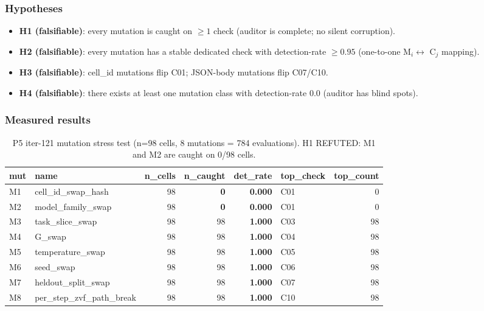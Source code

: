 \documentclass{article}  \usepackage[preprint,nonatbib]{neurips_2026} \usepackage[numbers]{natbib}
\begin{document}
\subsubsection{Hypotheses}
\begin{itemize}
  \item \textbf{H1 (falsifiable)}: every mutation is caught on $\geq 1$
        check (auditor is complete; no silent corruption).
  \item \textbf{H2 (falsifiable)}: every mutation has a stable dedicated
        check with detection-rate $\geq 0.95$ (one-to-one
        M$_i \leftrightarrow$ C$_j$ mapping).
  \item \textbf{H3 (falsifiable)}: cell\_id mutations flip C01; JSON-body
        mutations flip C07/C10.
  \item \textbf{H4 (falsifiable)}: there exists at least one mutation
        class with detection-rate $0.0$ (auditor has blind spots).
\end{itemize}

\subsubsection{Measured results}

\begin{table}[ht]
\centering
\small
\begin{tabular}{l l r r r l r}
\toprule
mut & name & n\_cells & n\_caught & det\_rate & top\_check & top\_count \\
\midrule
M1 & cell\_id\_swap\_hash        & 98 &  \textbf{0} & \textbf{0.000} & C01 & 0  \\
M2 & model\_family\_swap         & 98 &  \textbf{0} & \textbf{0.000} & C01 & 0  \\
M3 & task\_slice\_swap           & 98 & 98 & \textbf{1.000} & C03 & 98 \\
M4 & G\_swap                     & 98 & 98 & \textbf{1.000} & C04 & 98 \\
M5 & temperature\_swap           & 98 & 98 & \textbf{1.000} & C05 & 98 \\
M6 & seed\_swap                  & 98 & 98 & \textbf{1.000} & C06 & 98 \\
M7 & heldout\_split\_swap        & 98 & 98 & \textbf{1.000} & C07 & 98 \\
M8 & per\_step\_zvf\_path\_break & 98 & 98 & \textbf{1.000} & C10 & 98 \\
\bottomrule
\end{tabular}
\caption{P5 iter-121 mutation stress test (n=98 cells, 8 mutations = 784
evaluations). H1 REFUTED: M1 and M2 are caught on 0/98 cells.}
\label{tab:p5-iter121-mutation}
\end{table}
\end{document}
